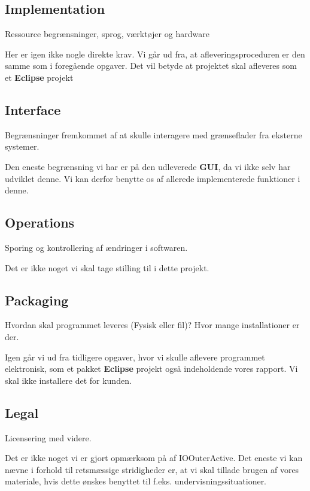 \subsection{Implementation}
Ressource begrænsninger, sprog, værktøjer og hardware


Her er igen ikke nogle direkte krav. Vi går ud fra, at afleveringsproceduren er den samme som i foregående opgaver. Det vil betyde at projektet skal afleveres som et \textbf{Eclipse} projekt
\subsection{Interface}
Begrænsninger fremkommet af at skulle interagere med grænseflader fra eksterne systemer.


Den eneste begrænsning vi har er på den udleverede \textbf{GUI}, da vi ikke selv har udviklet denne. Vi kan derfor benytte os af allerede implementerede funktioner i denne.
\subsection{Operations}
Sporing og kontrollering af ændringer i softwaren.


Det er ikke noget vi skal tage stilling til i dette projekt.
\subsection{Packaging}
Hvordan skal programmet leveres (Fysisk eller fil)? Hvor mange installationer er der.


Igen går vi ud fra tidligere opgaver, hvor vi skulle aflevere programmet elektronisk, som et pakket \textbf{Eclipse} projekt også indeholdende vores rapport. Vi skal ikke installere det for kunden.
\subsection{Legal}
Licensering med videre.


Det er ikke noget vi er gjort opmærksom på af IOOuterActive. Det eneste vi kan nævne i forhold til retsmæssige stridigheder er, at vi skal tillade brugen af vores materiale, hvis dette ønskes benyttet til f.eks. undervisningssituationer.